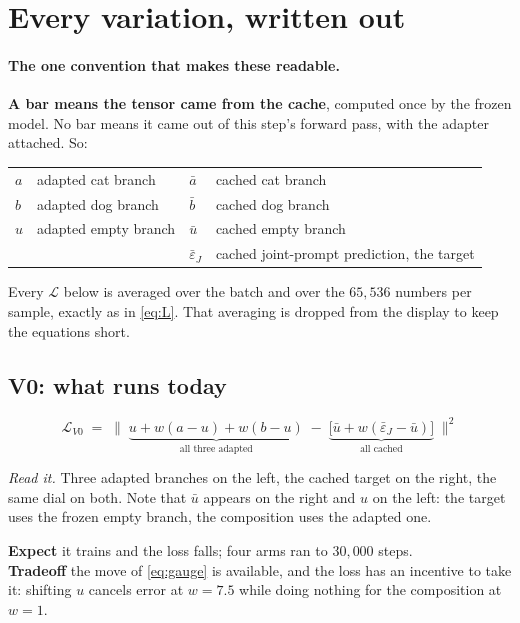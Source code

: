 \documentclass[11pt]{article}
\newcommand{\eps}{\varepsilon}
\newcommand{\B}[1]{\textbf{#1}}
\newcommand{\LL}{\mathcal{L}}
\newcommand{\sq}[1]{\Big\lVert #1 \Big\rVert^2}
\newcommand{\readit}[1]{\par\smallskip\noindent\textit{Read it.} #1}
\begin{document}
\section{Every variation, written out}
\label{sec:vars}

\paragraph{The one convention that makes these readable.}
\B{A bar means the tensor came from the cache}, computed once by the frozen model. No bar means it
came out of this step's forward pass, with the adapter attached. So:
\begin{center}
\small
\begin{tabular}{ll@{\qquad}ll}
\toprule
$a$ & adapted cat branch & $\bar a$ & cached cat branch \\
$b$ & adapted dog branch & $\bar b$ & cached dog branch \\
$u$ & adapted empty branch & $\bar u$ & cached empty branch \\
 & & $\bar\eps_J$ & cached joint-prompt prediction, the target \\
\bottomrule
\end{tabular}
\end{center}
Every $\LL$ below is averaged over the batch and over the $65{,}536$ numbers per sample, exactly as
in \eqref{eq:L}. That averaging is dropped from the display to keep the equations short.

\subsection*{V0: what runs today}
\begin{equation}
  \LL_{V0} \;=\; \sq{\;\underbrace{u + w(a-u) + w(b-u)}_{\text{all three adapted}}
  \;-\;\underbrace{\big[\bar u + w(\bar\eps_J - \bar u)\big]}_{\text{all cached}}\;}
\end{equation}
\readit{Three adapted branches on the left, the cached target on the right, the same dial on both.
Note that $\bar u$ appears on the right and $u$ on the left: the target uses the frozen empty
branch, the composition uses the adapted one.}

\noindent\B{Expect} \quad it trains and the loss falls; four arms ran to $30{,}000$ steps.\\
\B{Tradeoff} \quad the move of \eqref{eq:gauge} is available, and the loss has an incentive to take
it: shifting $u$ cancels error at $w = 7.5$ while doing nothing for the composition at $w = 1$.
\end{document}
